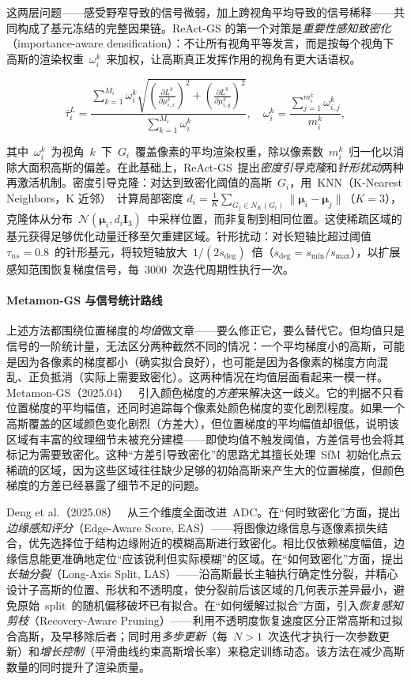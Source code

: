 这两层问题——感受野窄导致的信号微弱，加上跨视角平均导致的信号稀释——共同构成了基元冻结的完整因果链。ReAct-GS 的第一个对策是\emph{重要性感知致密化}（importance-aware densification）：不让所有视角平等发言，而是按每个视角下高斯的渲染权重~$\omega_i^k$~来加权，让高斯真正发挥作用的视角有更大话语权。

\[
\bar{\tau}_i^L = \frac{\sum_{k=1}^{M_i} \omega_i^k \sqrt{(\frac{\partial L^k}{\partial\mu_{i,x}^k})^2 + (\frac{\partial L^k}{\partial\mu_{i,y}^k})^2}}{\sum_{k=1}^{M_i} \omega_i^k}, \quad \omega_i^k = \frac{\sum_{j=1}^{m_i^k} \omega_{i,j}^k}{m_i^k},
\]

其中~$\omega_i^k$~为视角~$k$~下~$G_i$~覆盖像素的平均渲染权重，除以像素数~$m_i^k$~归一化以消除大面积高斯的偏差。在此基础上，ReAct-GS~提出\emph{密度引导克隆}和\emph{针形扰动}两种再激活机制。密度引导克隆：对达到致密化阈值的高斯~$G_i$，用~KNN（K-Nearest Neighbors，K 近邻）~计算局部密度 $d_i = \frac{1}{K}\sum_{G_j \in N_K(G_i)}\|\boldsymbol{\mu}_i - \boldsymbol{\mu}_j\|$（$K=3$），克隆体从分布~$\mathcal{N}(\boldsymbol{\mu}_i, d_i \mathbf{I}_3)$~中采样位置，而非复制到相同位置。这使稀疏区域的基元获得足够优化动量迁移至欠重建区域。针形扰动：对长短轴比超过阈值~$\tau_{ns}=0.8$~的针形基元，将较短轴放大~$1/(2s_\text{deg})$~倍（$s_\text{deg} = s_\text{min}/s_\text{max}$），以扩展感知范围恢复梯度信号，每~3000~次迭代周期性执行一次。

\paragraph{Metamon-GS 与信号统计路线}
上述方法都围绕位置梯度的\emph{均值}做文章——要么修正它，要么替代它。但均值只是信号的一阶统计量，无法区分两种截然不同的情况：一个平均梯度小的高斯，可能是因为各像素的梯度都小（确实拟合良好），也可能是因为各像素的梯度方向混乱、正负抵消（实际上需要致密化）。这两种情况在均值层面看起来一模一样。Metamon-GS（2025.04）~\cite{2504_14460} 引入颜色梯度的\emph{方差}来解决这一歧义。它的判据不只看位置梯度的平均幅值，还同时追踪每个像素处颜色梯度的变化剧烈程度。如果一个高斯覆盖的区域颜色变化剧烈（方差大），但位置梯度的平均幅值却很低，说明该区域有丰富的纹理细节未被充分建模——即使均值不触发阈值，方差信号也会将其标记为需要致密化。这种``方差引导致密化''的思路尤其擅长处理~SfM~初始化点云稀疏的区域，因为这些区域往往缺少足够的初始高斯来产生大的位置梯度，但颜色梯度的方差已经暴露了细节不足的问题。

Deng et al.（2025.08）~\cite{2508_12313} 从三个维度全面改进~ADC。在``何时致密化''方面，提出\emph{边缘感知评分}（Edge-Aware Score, EAS）——将图像边缘信息与逐像素损失结合，优先选择位于结构边缘附近的模糊高斯进行致密化。相比仅依赖梯度幅值，边缘信息能更准确地定位``应该锐利但实际模糊''的区域。在``如何致密化''方面，提出\emph{长轴分裂}（Long-Axis Split, LAS）——沿高斯最长主轴执行确定性分裂，并精心设计子高斯的位置、形状和不透明度，使分裂前后该区域的几何表示差异最小，避免原始~split~的随机偏移破坏已有拟合。在``如何缓解过拟合''方面，引入\emph{恢复感知剪枝}（Recovery-Aware Pruning）——利用不透明度恢复速度区分正常高斯和过拟合高斯，及早移除后者；同时用\emph{多步更新}（每~$N>1$~次迭代才执行一次参数更新）和\emph{增长控制}（平滑曲线约束高斯增长率）来稳定训练动态。该方法在减少高斯数量的同时提升了渲染质量。

